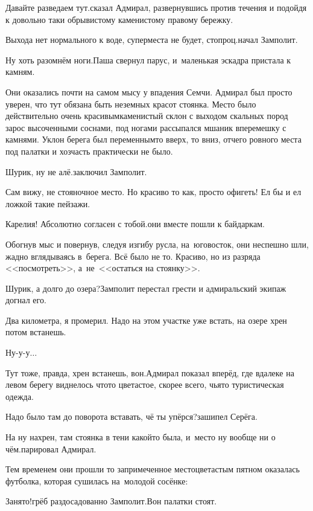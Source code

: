 \diagdash Давайте разведаем тут.\mdash сказал Адмирал, развернувшись против течения и подойдя к довольно таки обрывистому каменистому правому бережку.

\diagdash Выхода нет нормального к воде, супер\sdash места не будет, стопроц.\mdash начал Замполит.

\diagdash Ну хоть разомнём ноги.\mdash Паша свернул парус, и~маленькая эскадра пристала к камням.

Они оказались почти на самом мысу у впадения Семчи. Адмирал был просто уверен, что тут обязана быть неземных красот стоянка. Место было действительно очень красивым\mdash каменистый склон с выходом скальных пород зарос высоченными соснами, под ногами рассыпался мшаник вперемешку с камнями. Уклон берега был переменным\mdash то вверх, то вниз, отчего ровного места под палатки и хозчасть практически не было.

\diagdash Шурик, ну не алё.\mdash заключил Замполит.

\diagdash Сам вижу, не стояночное место. Но красиво то как, просто офигеть! Ел бы и ел ложкой такие пейзажи.

\diagdash Карелия! Абсолютно согласен с тобой.\mdash они вместе пошли к байдаркам.

Обогнув мыс и повернув, следуя изгибу русла, на~юго\sdash восток, они неспешно шли, жадно вглядываясь в~берега. Всё было не то. Красиво, но из разряда <<посмотреть>>, а~не~<<остаться на стоянку>>.

\diagdash Шурик, а долго до озера?\mdash Замполит перестал грести и адмиральский экипаж догнал его.

\diagdash Два километра, я промерил. Надо на этом участке уже встать, на озере хрен потом встанешь.

\diagdash Ну-у-у$\ldots$

\diagdash Тут тоже, правда, хрен встанешь, вон.\mdash Адмирал показал вперёд, где вдалеке на левом берегу виднелось что\sdash то цветастое, скорее всего, чья\sdash то туристическая одежда. 

\diagdash Надо было там до поворота вставать, чё ты упёрся?\mdash зашипел Серёга.

\diagdash На ну нахрен, там стоянка в тени какой\sdash то была, и~место ну вообще ни о чём.\mdash парировал Адмирал.

Тем временем они прошли то запримеченное место\mdash цветастым пятном оказалась футболка, которая сушилась на~молодой сосёнке:

\diagdash Занято!\mdash грёб раздосадованно Замполит.\mdash Вон палатки стоят.

